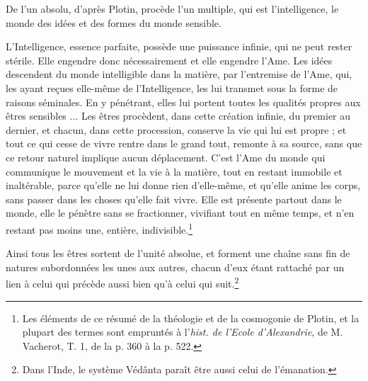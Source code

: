 \documentclass[a4paper, 11pt, oneside]{article}
\begin{document}
De l'un absolu, d'après Plotin, procède l'un multiple, qui est l'intelligence, le monde des idées et des formes du monde sensible.

L'Intelligence, essence parfaite, possède une puissance infinie, qui ne peut rester stérile. Elle engendre donc nécessairement et elle engendre l'Ame. Les idées descendent du monde intelligible dans la matière, par l'entremise de l'Ame, qui, les ayant reçues elle-même de l'Intelligence, les lui transmet sous la forme de raisons séminales. En y pénétrant, elles lui portent toutes les qualités propres aux êtres sensibles ... Les êtres procèdent, dans cette création infinie, du premier au dernier, et chacun, dans cette procession, conserve la vie qui lui est propre ; et tout ce qui cesse de vivre rentre dans le grand tout, remonte à sa source, sans que ce retour naturel implique aucun déplacement. C'est l'Ame du monde qui communique le mouvement et la vie à la matière, tout en restant immobile et inaltérable, parce qu'elle ne lui donne rien d'elle-même, et qu'elle anime les corps, sans passer dans les choses qu'elle fait vivre. Elle est présente partout dans le monde, elle le pénètre sans se fractionner, vivifiant tout en même temps, et n'en restant pas moins une, entière, indivisible.\footnote{Les éléments de ce résumé de la théologie et de la cosmogonie de Plotin, et la plupart des termes sont empruntés à l'\emph{hist. de l'Ecole d'Alexandrie}, de M. Vacherot, T. 1, de la p. 360 à la p. 522.}

Ainsi tous les êtres sortent de l'unité absolue, et forment une chaîne sans fin de natures subordonnées les unes aux autres, chacun d'eux étant rattaché par un lien à celui qui précède aussi bien qu'à celui qui suit.\footnote{Dans l'Inde, le système Védânta paraît être aussi celui de l'émanation.}
\end{document}
